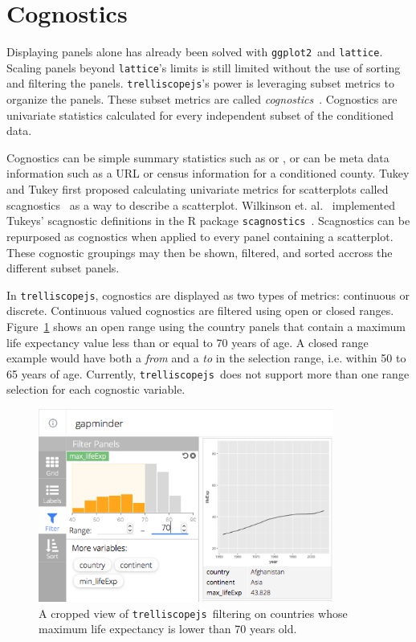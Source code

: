 \documentclass[stat,dissertation]{puthesis}\usepackage[]{graphicx}\usepackage{xcolor}
\newcommand{\pkg}[1]{\texttt{#1}}
\newcommand{\ggplot}{\pkg{ggplot2}}
\newcommand{\trelliscopejs}{\pkg{trelliscopejs}}
\begin{document}
\section{Cognostics}

Displaying panels alone has already been solved with \ggplot~and \pkg{lattice}.  Scaling panels beyond \pkg{lattice}'s limits is still limited without the use of sorting and filtering the panels.  \trelliscopejs's power is leveraging subset metrics to organize the panels.  These subset metrics are called \emph{cognostics}~\cite{Tukey1985}.  Cognostics are univariate statistics calculated for every independent subset of the conditioned data.

Cognostics can be simple summary statistics such as  or , or can be meta data information such as a URL or census information for a conditioned county.  Tukey and Tukey first proposed calculating univariate metrics for scatterplots called scagnostics~\cite{Tukey1985} as a way to describe a scatterplot.  Wilkinson et. al.~\cite{scagnostics} implemented Tukeys' scagnostic definitions in the R package \pkg{scagnostics}~\cite{r_scagnostics}. Scagnostics can be repurposed as cognostics when applied to every panel containing a scatterplot.  These cognostic groupings may then be shown, filtered, and sorted accross the different subset panels.

In \trelliscopejs, cognostics are displayed as two types of metrics: continuous or discrete.  Continuous valued cognostics are filtered using open or closed ranges.  Figure~\ref{fig:gap_seventy} shows an open range using the  country panels that contain a maximum life expectancy value less than or equal to 70 years of age.  A closed range example would have both a \emph{from} and a \emph{to} in the selection range, i.e. within 50 to 65 years of age. Currently, \trelliscopejs~does not support more than one range selection for each cognostic variable.

\begin{figure}[H]
  \label{fig:gap_seventy}
  \centering
  \includegraphics[height=2.5in]{./figs/tjs_filter_70.png}
  \caption{A cropped view of \trelliscopejs~filtering on countries whose maximum life expectancy is lower than 70 years old.}
\end{figure}
\end{document}
